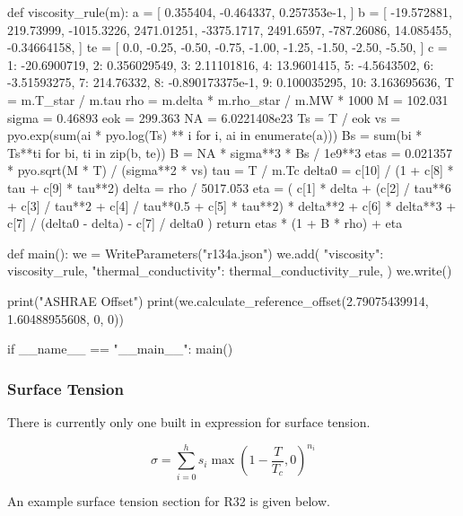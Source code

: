\documentclass[oneside]{book}
\begin{document}
\begin{python}
def viscosity_rule(m):
    a = [
        0.355404,
        -0.464337,
        0.257353e-1,
    ]
    b = [
        -19.572881,
        219.73999,
        -1015.3226,
        2471.01251,
        -3375.1717,
        2491.6597,
        -787.26086,
        14.085455,
        -0.34664158,
    ]
    te = [
        0.0,
        -0.25,
        -0.50,
        -0.75,
        -1.00,
        -1.25,
        -1.50,
        -2.50,
        -5.50,
    ]
    c = {
        1: -20.6900719,
        2: 0.356029549,
        3: 2.11101816,
        4: 13.9601415,
        5: -4.5643502,
        6: -3.51593275,
        7: 214.76332,
        8: -0.890173375e-1,
        9: 0.100035295,
        10: 3.163695636,
    }
    T = m.T_star / m.tau
    rho = m.delta * m.rho_star / m.MW * 1000
    M = 102.031
    sigma = 0.46893
    eok = 299.363
    NA = 6.0221408e23
    Ts = T / eok
    vs = pyo.exp(sum(ai * pyo.log(Ts) ** i for i, ai in enumerate(a)))
    Bs = sum(bi * Ts**ti for bi, ti in zip(b, te))
    B = NA * sigma**3 * Bs / 1e9**3
    etas = 0.021357 * pyo.sqrt(M * T) / (sigma**2 * vs)
    tau = T / m.Tc
    delta0 = c[10] / (1 + c[8] * tau + c[9] * tau**2)
    delta = rho / 5017.053
    eta = (
        c[1] * delta
        + (c[2] / tau**6 + c[3] / tau**2 + c[4] / tau**0.5 + c[5] * tau**2)
        * delta**2
        + c[6] * delta**3
        + c[7] / (delta0 - delta)
        - c[7] / delta0
    )
    return etas * (1 + B * rho) + eta


def main():
    we = WriteParameters("r134a.json")
    we.add(
        {
            "viscosity": viscosity_rule,
            "thermal_conductivity": thermal_conductivity_rule,
        }
    )
    we.write()
    
    print("ASHRAE Offset")
    print(we.calculate_reference_offset(2.79075439914, 1.60488955608, 0, 0))

if __name__ == "__main__":
    main()
\end{python} 

\subsubsection{Surface Tension} 

There is currently only one built in expression for surface tension.

\begin{equation}
	\sigma = \sum_{i = 0}^h s_i \max\left(1 - \frac{T}{T_c}, 0 \right)^{n_i}
\end{equation}

An example surface tension section for R32 is given below.
\end{document}
